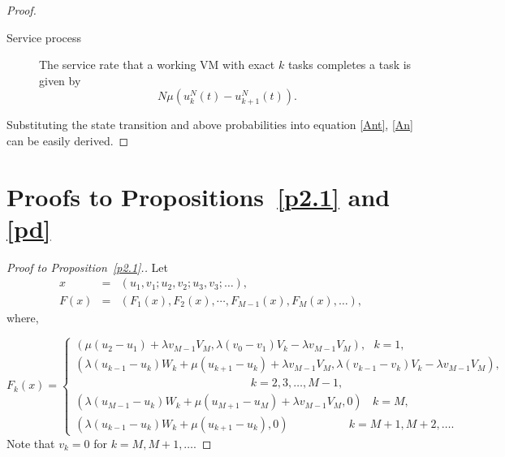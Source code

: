 \documentclass[12pt]{article}
\begin{document}
\begin{proof}
\begin{description}
  \item[Service process] The service rate that a working VM with exact $k$ tasks completes a task is given by
     \begin{equation}
        N\mu(u_{k}^{N}(t)-u_{k+1}^{N}(t)).
     \end{equation}
\end{description}
Substituting the state transition and above probabilities into equation \eqref{Ant}, \eqref{An} can be easily derived.
\end{proof}


\section{Proofs to Propositions~\ref{p2.1} and \ref{pd}}
\label{appendix C}


\begin{proof}[Proof to Proposition~\ref{p2.1}.]
 Let \begin{eqnarray*}
                       x&=& (u_1,v_1;u_2,v_2;u_{3},v_{3};\ldots), \\
                     F(x)&=& (F_1(x),F_2(x),\cdots,F_{M-1}(x),F_M(x),\ldots),
                    \end{eqnarray*}
where,

\begin{equation}
  F_k(x)=\left\{\begin{array}{ll}
                   \left(\mu(u_{2}-u_{1})+\lambda v_{M-1}V_{M},  \lambda (v_{0}-v_{1})V_{k}-\lambda v_{M-1}V_{M}\right),~~~k=1,\\ [4mm]
                  \left( \lambda (u_{k-1}-u_{k})W_{k}+\mu(u_{k+1}-u_{k})+\lambda v_{M-1}V_{M}, \lambda (v_{k-1}-v_{k})V_{k}-\lambda v_{M-1}V_{M}\right),  \\[4mm]
                  ~~~~~~~~~~~~~~~~~~~~~~~~~~~~~~~~~~~~~~~~~~~~~~~~~~~~~~~~~~~~~~~~~~~~~~k=2,3,\ldots,M-1, \\[4mm]
                  (\lambda (u_{M-1}-u_{k})W_{k}+\mu(u_{M+1}-u_{M})+\lambda v_{M-1}V_{M},0)~~~~k=M,\\[4mm]
                  (\lambda (u_{k-1}-u_{k})W_{k}+\mu(u_{k+1}-u_{k}),0)~~~~~~~~~~~~~~~~~~~~~~~ ~k=M+1,M+2,\ldots.
                \end{array}
  \right.
\end{equation}
Note that $v_{k}=0$ for $k=M,M+1,\ldots$.


\end{proof}
\end{document}
